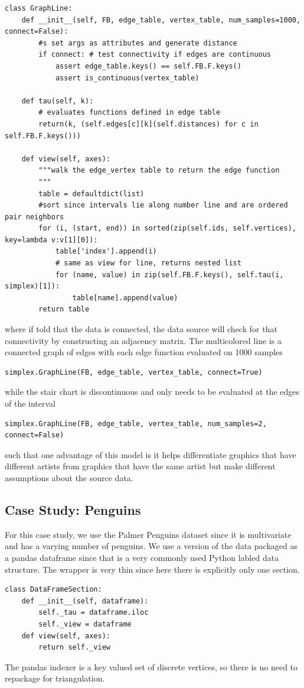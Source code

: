 \documentclass[../main.tex]{subfiles}
\begin{document}
\begin{verbatim}
class GraphLine:
    def __init__(self, FB, edge_table, vertex_table, num_samples=1000, connect=False):
        #s set args as attributes and generate distance
        if connect: # test connectivity if edges are continuous
            assert edge_table.keys() == self.FB.F.keys()
            assert is_continuous(vertex_table)

    def tau(self, k):
        # evaluates functions defined in edge table
        return(k, (self.edges[c][k](self.distances) for c in self.FB.F.keys()))

    def view(self, axes):
        """walk the edge_vertex table to return the edge function
        """
        table = defaultdict(list)
        #sort since intervals lie along number line and are ordered pair neighbors
        for (i, (start, end)) in sorted(zip(self.ids, self.vertices), key=lambda v:v[1][0]):
            table['index'].append(i)
            # same as view for line, returns nested list
            for (name, value) in zip(self.FB.F.keys(), self.tau(i, simplex)[1]):
                table[name].append(value)
        return table
\end{verbatim}
where if told that the data is connected, the data source will check for that connectivity by constructing an adjacency matrix. The multicolored line is a connected graph of edges with each edge function evaluated on 1000 samples 
\begin{verbatim}
simplex.GraphLine(FB, edge_table, vertex_table, connect=True)
\end{verbatim}
while the stair chart is discontinuous and only needs to be evaluated at the edges of the interval 
\begin{verbatim}
simplex.GraphLine(FB, edge_table, vertex_table, num_samples=2, connect=False)
\end{verbatim}
such that one advantage of this model is it helps differentiate graphics that have different artists from graphics that have the same artist but make different assumptions about the source data. 


\subsection{Case Study: Penguins}
For this case study, we use the Palmer Penguins dataset\cite{gormanEcologicalSexualDimorphism2014, horstPalmerpenguinsPalmerArchipelago2020} since it is multivariate and has a varying number of penguins. We use a version of the data packaged as a pandas dataframe\cite{nakhaeeMcnakhaeePalmerpenguins2021, jeff_reback_2020_3715232} since that is a very commonly used Python labled data structure. The wrapper is very thin since here there is explicitly only one section.
\begin{verbatim}
class DataFrameSection:
    def __init__(self, dataframe):
        self._tau = dataframe.iloc
        self._view = dataframe
    def view(self, axes):
        return self._view
\end{verbatim}
The pandas indexer is a key valued set of discrete vertices, so there is no need to repackage for triangulation. 
\end{document}
